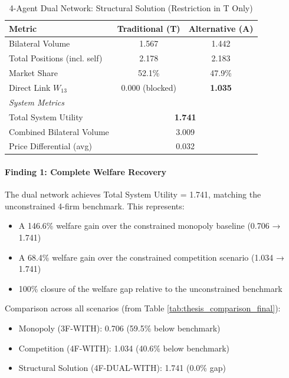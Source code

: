 \begin{table}[h]
\centering
\caption{4-Agent Dual Network: Structural Solution (Restriction in T Only)}
\label{tab:4f_dual_restricted}
\begin{tabular}{lcc}
\hline
\textbf{Metric} & \textbf{Traditional (T)} & \textbf{Alternative (A)} \\ \hline
Bilateral Volume & 1.567 & 1.442 \\
Total Positions (incl. self) & 2.178 & 2.183 \\
Market Share & 52.1\% & 47.9\% \\
Direct Link $W_{13}$ & 0.000 (blocked) & \textbf{1.035} \\
\hline
\multicolumn{3}{l}{\textit{System Metrics}} \\
Total System Utility & \multicolumn{2}{c}{\textbf{1.741}} \\
Combined Bilateral Volume & \multicolumn{2}{c}{3.009} \\
Price Differential (avg) & \multicolumn{2}{c}{0.032} \\
\hline
\end{tabular}
\end{table}

\paragraph{Finding 1: Complete Welfare Recovery}

The dual network achieves Total System Utility = 1.741, matching the unconstrained 4-firm benchmark. This represents:
\begin{itemize}
    \item A 146.6\% welfare gain over the constrained monopoly baseline (0.706 → 1.741)
    \item A 68.4\% welfare gain over the constrained competition scenario (1.034 → 1.741)
    \item 100\% closure of the welfare gap relative to the unconstrained benchmark
\end{itemize}

Comparison across all scenarios (from Table \ref{tab:thesis_comparison_final}):
\begin{itemize}
    \item Monopoly (3F-WITH): 0.706 (59.5\% below benchmark)
    \item Competition (4F-WITH): 1.034 (40.6\% below benchmark)
    \item Structural Solution (4F-DUAL-WITH): 1.741 (0.0\% gap)
\end{itemize}

